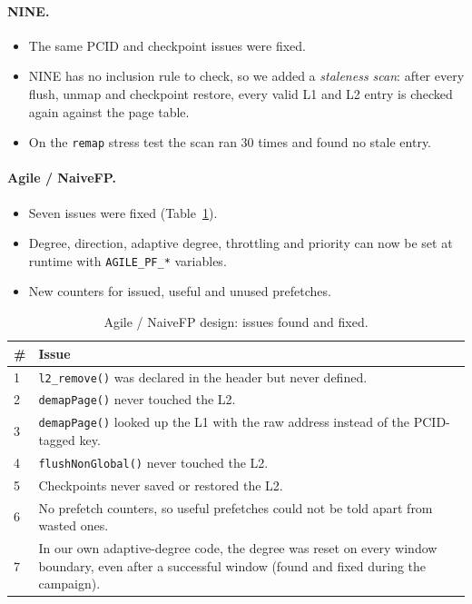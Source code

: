 \paragraph{NINE.}
\begin{itemize}
    \item The same PCID and checkpoint issues were fixed.
    \item NINE has no inclusion rule to check, so we added a \emph{staleness scan}: after every flush, unmap and checkpoint restore, every valid L1 and L2 entry is checked again against the page table.
    \item On the \texttt{remap} stress test the scan ran 30 times and found no stale entry.
\end{itemize}

\paragraph{Agile / NaiveFP.}
\begin{itemize}
    \item Seven issues were fixed (Table~\ref{tab:agile_bugs}).
    \item Degree, direction, adaptive degree, throttling and priority can now be set at runtime with \texttt{AGILE\_PF\_*} variables.
    \item New counters for issued, useful and unused prefetches.
\end{itemize}

\begin{table}[H]
\centering
\small
\caption{Agile / NaiveFP design: issues found and fixed.}
\label{tab:agile_bugs}
\begin{tabularx}{\textwidth}{l X}
\toprule
\textbf{\#} & \textbf{Issue} \\
\midrule
1 & \texttt{l2\_remove()} was declared in the header but never defined. \\
2 & \texttt{demapPage()} never touched the L2. \\
3 & \texttt{demapPage()} looked up the L1 with the raw address instead of the PCID-tagged key. \\
4 & \texttt{flushNonGlobal()} never touched the L2. \\
5 & Checkpoints never saved or restored the L2. \\
6 & No prefetch counters, so useful prefetches could not be told apart from wasted ones. \\
7 & In our own adaptive-degree code, the degree was reset on every window boundary, even after a successful window (found and fixed during the campaign). \\
\bottomrule
\end{tabularx}
\end{table}

